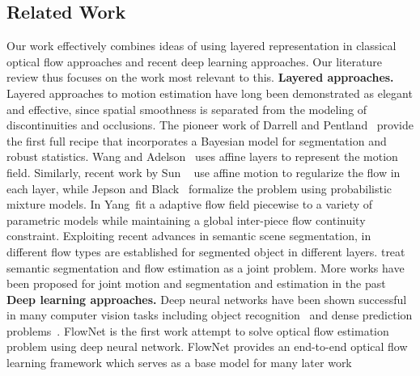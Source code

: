 \documentclass[10pt,twocolumn,letterpaper]{article}
\begin{document}
\subsection{Related Work}
Our work effectively combines ideas of using layered representation in classical optical flow approaches and recent deep learning approaches. Our literature review thus focuses on the work most relevant to this.
\newline
\newline
\noindent \textbf{Layered approaches.}
Layered approaches to motion estimation have long been demonstrated as elegant and effective, since spatial smoothness is separated from the modeling of discontinuities and occlusions. The pioneer work of Darrell and Pentland~\cite{darrell1991robust}\cite{darrell1995cooperative} provide the first full recipe that incorporates a Bayesian model for segmentation and robust statistics. Wang and Adelson~\cite{wang1993layered}\cite{wang1994representing} uses affine layers to represent the motion field. Similarly, recent work by Sun \etal~\cite{sun2010layered}\cite{sun2012layered} use affine motion to regularize the flow in each layer, while Jepson and Black~\cite{341161} formalize the problem using probabilistic mixture models. In \cite{yang2015dense} Yang~\etal fit a adaptive flow field piecewise to a variety of parametric models while maintaining a global inter-piece flow continuity constraint. Exploiting recent advances in semantic scene segmentation, in \cite{Sevilla-Lara_2016_CVPR} different flow types are established for segmented object in different layers. \cite{Hur2016} treat semantic segmentation and flow estimation as a joint problem. More works have been proposed for joint motion and segmentation and estimation in the past~\cite{birchfield1999multiway}\cite{cremers2005motion}\cite{memin2002hierarchical}\cite{roussos2012dense}\cite{unger2012joint}\cite{yamaguchi2013robust}\cite{zitnick2005consistent}
\newline
\newline
\noindent \textbf{Deep learning approaches.}
Deep neural networks have been shown successful in many computer vision tasks including object recognition~\cite{he2016deep} and dense prediction problems~\cite{zheng2015conditional}\cite{long2015fully}. FlowNet is the first work attempt to solve optical flow estimation problem using deep neural network. FlowNet provides an end-to-end optical flow learning framework which serves as a base model for many later work~\cite{Ilg_2017_CVPR}\cite{ahmadi2016unsupervised}\cite{ren2017unsupervised}\cite{DBLP:journals/corr/YuHD16}
\end{document}

